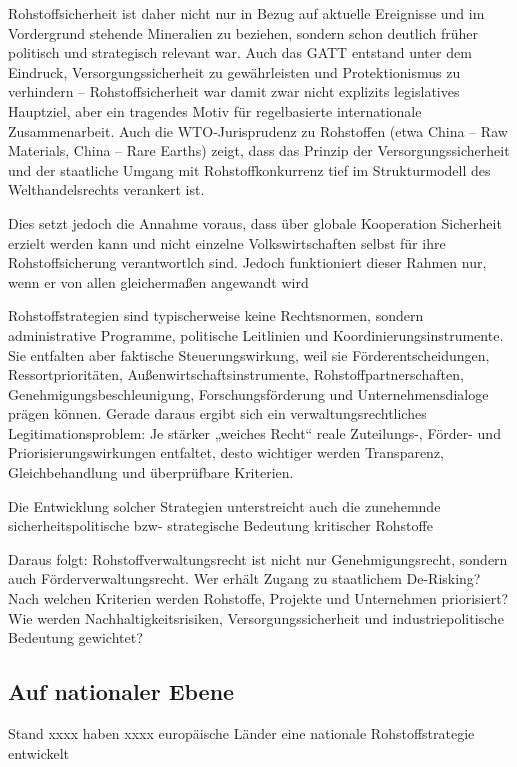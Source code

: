 \documentclass[12pt,a4paper,oneside]{book} %
\begin{document}
Rohstoffsicherheit ist daher nicht nur in Bezug auf aktuelle Ereignisse und im Vordergrund stehende Mineralien zu beziehen, sondern schon deutlich früher politisch und strategisch relevant war. Auch das GATT entstand unter dem Eindruck, Versorgungssicherheit zu gewährleisten und Protektionismus zu verhindern -- Rohstoffsicherheit war damit zwar nicht explizits legislatives Hauptziel, aber ein tragendes Motiv für regelbasierte internationale Zusammenarbeit. Auch die WTO‑Jurisprudenz zu Rohstoffen (etwa China – Raw Materials, China – Rare Earths) zeigt, dass das Prinzip der Versorgungssicherheit und der staatliche Umgang mit Rohstoffkonkurrenz tief im Strukturmodell des Welthandelsrechts verankert ist.

Dies setzt jedoch die Annahme voraus, dass über globale Kooperation Sicherheit erzielt werden kann und nicht einzelne Volkswirtschaften selbst für ihre Rohstoffsicherung verantwortlch sind. Jedoch funktioniert dieser Rahmen nur, wenn er von allen gleichermaßen angewandt wird

Rohstoffstrategien sind typischerweise keine Rechtsnormen, sondern administrative Programme, politische Leitlinien und Koordinierungsinstrumente. Sie entfalten aber faktische Steuerungswirkung, weil sie Förderentscheidungen, Ressortprioritäten, Außenwirtschaftsinstrumente, Rohstoffpartnerschaften, Genehmigungsbeschleunigung, Forschungsförderung und Unternehmensdialoge prägen können. Gerade daraus ergibt sich ein verwaltungsrechtliches Legitimationsproblem: Je stärker „weiches Recht“ reale Zuteilungs-, Förder- und Priorisierungswirkungen entfaltet, desto wichtiger werden Transparenz, Gleichbehandlung und überprüfbare Kriterien.

Die Entwicklung solcher Strategien unterstreicht auch die zunehemnde sicherheitspolitische bzw- strategische Bedeutung kritischer Rohstoffe

Daraus folgt: Rohstoffverwaltungsrecht ist nicht nur Genehmigungsrecht, sondern auch Förderverwaltungsrecht. Wer erhält Zugang zu staatlichem De-Risking? Nach welchen Kriterien werden Rohstoffe, Projekte und Unternehmen priorisiert? Wie werden Nachhaltigkeitsrisiken, Versorgungssicherheit und industriepolitische Bedeutung gewichtet?



\subsection{Auf nationaler Ebene}
Stand xxxx haben xxxx europäische Länder eine nationale Rohstoffstrategie entwickelt
\end{document}
